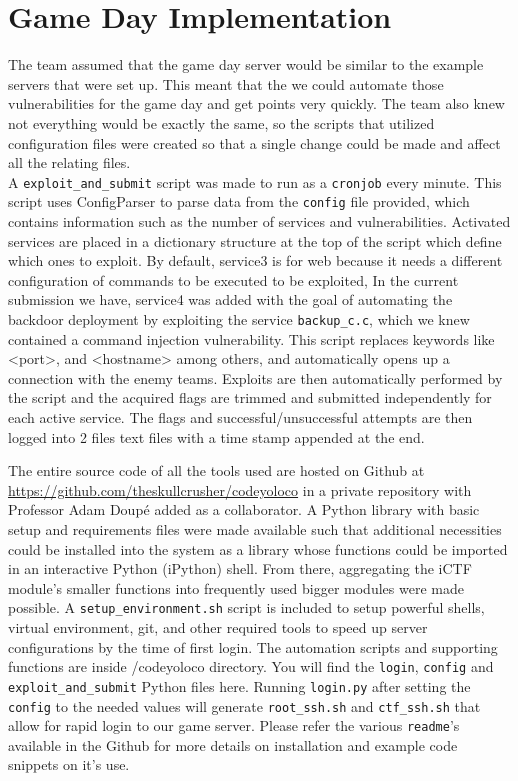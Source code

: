 \documentclass[12pt]{report}
\begin{document}
\section*{Game Day Implementation}
The team assumed that the game day server would be similar to the example servers that were set up. This meant that the we could automate those vulnerabilities for the game day and get points very quickly.
The team also knew not everything would be exactly the same, so the scripts that utilized configuration files were created so that a single change could be made and affect all the relating files.\\

\noindent A \texttt{exploit\_and\_submit} script was made to run as a \texttt{cronjob} every minute. This script uses ConfigParser to parse data from the \texttt{config} file provided, which contains information such as the number of services and vulnerabilities. Activated services are placed in a dictionary structure at the top of the script which define which ones to exploit. 
By default, service3 is for web because it needs a different configuration of commands to be executed to be exploited, In the current submission we have, service4 was added with the goal of automating the backdoor deployment by exploiting the service \texttt{backup\_c.c}, which we knew contained a command injection vulnerability. This script replaces keywords like <port>, and <hostname> among others, and automatically opens up a connection with the enemy teams. Exploits are then automatically performed by the script and the acquired flags are trimmed and submitted independently for each active service. The flags and successful/unsuccessful attempts are then logged into 2 files text files with a time stamp appended at the end.


\noindent The entire source code of all the tools used are hosted on Github at \url{https://github.com/theskullcrusher/codeyoloco} in a private repository with Professor Adam Doup\'e added as a collaborator. A Python library with basic setup and requirements files were made available such that additional necessities could be installed into the system as a library whose functions could be imported in an interactive Python (iPython) shell. From there, aggregating the iCTF module's smaller functions into frequently used bigger modules were made possible. 
A \texttt{setup\_environment.sh} script is included to setup powerful shells, virtual environment, git, and other required tools to speed up server configurations by the time of first login. The automation scripts and supporting functions are inside /codeyoloco directory. You will find the \texttt{login}, \texttt{config} and \texttt{exploit\_and\_submit} Python files here. Running \texttt{login.py} after setting the \texttt{config} to the needed values will generate \texttt{root\_ssh.sh} and \texttt{ctf\_ssh.sh} that allow for rapid login to our game server.
Please refer the various \texttt{readme}'s available in the Github for more details on installation and example code snippets on it's use.
\end{document}
